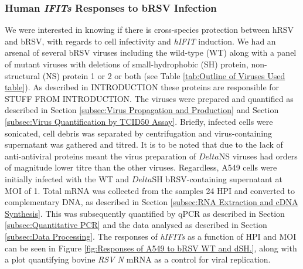 \subsubsection{Human \textit{IFITs} Responses to bRSV Infection} \label{Human IFITs Responses to bRSV}
We were interested in knowing if there is cross-species protection between hRSV and bRSV, with regards to cell infectivity and \textit{hIFIT} induction. We had an arsenal of several bRSV viruses including the wild-type (WT) along with a panel of mutant viruses with deletions of small-hydrophobic (SH) protein, non-structural (NS) protein 1 or 2 or both (see Table \ref{tab:Outline of Viruses Used table}). As described in INTRODUCTION these proteins are responsible for STUFF FROM INTRODUCTION. The viruses were prepared and quantified as described in Section \ref{subsec:Virus Propagation and Production} and Section \ref{subsec:Virus Quantification by TCID50 Assay}. Briefly, infected cells were sonicated, cell debris was separated by centrifugation and virus-containing supernatant was gathered and titred. It is to be noted that due to the lack of anti-antiviral proteins meant the virus preparation of \(Delta\)NS viruses had orders of magnitude lower titre than the other viruses. Regardless, A549 cells were initially infected with the WT and \(Delta\)SH bRSV-containing supernatant at MOI of 1. Total mRNA was collected from the samples 24 HPI and converted to complementary DNA, as described in Section \ref{subsec:RNA Extraction and cDNA Synthesis}. This was subsequently quantified by qPCR as described in Section \ref{subsec:Quantitative PCR} and the data analysed as described in Section \ref{subsec:Data Processing}. The responses of \textit{hIFITs} as a function of HPI and MOI can be seen in Figure \ref{fig:Responses of A549 to bRSV WT and dSH.}, along with a plot quantifying bovine \textit{RSV N} mRNA as a control for viral replication.

